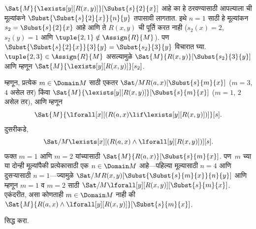 \documentclass[../../../include/open-logic-section]{subfiles}
\begin{document}
\begin{ex}
$\Sat{M}{\lexists[y][R(x,y)]}[\Subst{s}{2}{x}]$ आहे का हे ठरवण्यासाठी
आपल्याला ची मूल्यांकने
$\Subst{\Subst{s}{2}{x}}{n}{y}$ तपासावी लागतात. इथे $n = 1$ साठी हे
मूल्यांकन $s_2 = \Subst{s}{2}{x}$ आहे आणि ते $R(x,y)$ ची पूर्ति करत
नाही ($s_2(x) = 2$, $s_2(y) = 1$ आणि
$\tuple{2,1}\notin \Assign{R}{M}$). पण
$\Subst{\Subst{s}{2}{x}}{3}{y} = \Subst{s_2}{3}{y}$ विचारात घ्या.
$\tuple{2,3} \in \Assign{R}{M}$ असल्यामुळे
$\Sat{M}{R(x,y)}[\Subst{s_2}{3}{y}]$ आणि म्हणून
$\Sat{M}{\lexists[y][R(x,y)]}[s_2]$.

म्हणून, प्रत्येक $m \in \Domain M$ साठी एकतर
$\Sat/{M}{R(a,x)}[\Subst{s}{m}{x}]$ ($m = 3$, $4$ असेल तर) किंवा
$\Sat{M}{\lexists[y][R(x,y)]}[\Subst{s}{m}{x}]$ ($m = 1$, $2$ असेल तर),
आणि म्हणून
\[
\Sat{M}{\lforall[x][(R(a,x) \lif \lexists[y][R(x,y)])]}[s].
\]
दुसरीकडे,
\[
\Sat/{M}{\lexists[x][(R(a,x) \land \lforall[y][R(x,y)])]}[s].
\]
फक्त $m = 1$ आणि $m = 2$ यांच्यासाठी
$\Sat{M}{R(a,x)}[\Subst{s}{m}{x}]$. पण~$m$ च्या या दोन्ही मूल्यांपैकी
प्रत्येकासाठी एक $n \in \Domain M$ आहे---पहिल्या मूल्यासाठी $n = 4$
आणि दुसऱ्यासाठी $n = 1$---ज्यामुळे
$\Sat/{M}{R(x,y)}[\Subst{\Subst{s}{m}{x}}{n}{y}]$ आणि म्हणून $m = 1$
व $m = 2$ साठी
$\Sat/{M}{\lforall[y][R(x,y)]}[\Subst{s}{m}{x}]$. एकंदरीत, असा कोणताही
$m \in \Domain M$ नाही की
$\Sat{M}{R(a,x) \land \lforall[y][R(x,y)]}[\Subst{s}{m}{x}]$.
%
%
\end{ex}


\begin{prob}
   सिद्ध करा.
\end{prob}
\tagendprob

\end{document}
